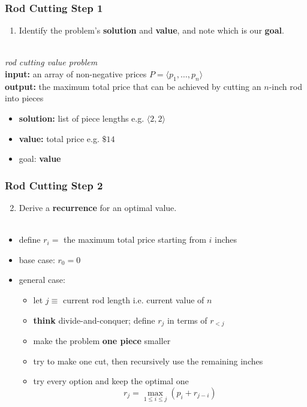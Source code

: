 \documentclass{beamer}
\newcommand{\stanza}{ \\~\ }
\begin{document}
\begin{frame} \frametitle{Rod Cutting Step 1}
\begin{enumerate}
  \item Identify the problem's \textbf{solution} and \textbf{value}, and note which is our \textbf{goal}.
  \stanza
\end{enumerate}
\emph{rod cutting value problem} \\
\textbf{input:} an array of non-negative prices $P=\langle p_1, \ldots, p_n \rangle$ \\
\textbf{output:} the maximum total price that can be achieved by cutting an $n$-inch rod into pieces
\begin{itemize}
  \item \textbf{solution:} list of piece lengths e.g. $\langle 2, 2 \rangle$
  \item \textbf{value:} total price e.g. $\$14$
  \item goal: \textbf{value}
\end{itemize}
\end{frame}

\begin{frame} \frametitle{Rod Cutting Step 2}
  \begin{enumerate}
    \setcounter{enumi}{1}
    \item Derive a \textbf{recurrence} for an optimal value.
    \stanza
  \end{enumerate}

  \begin{itemize}
    \item define $r_i = $ the maximum total price starting from $i$ inches
    \item base case: $r_0 = 0$
    \item general case:
    \begin{itemize}
      \item let $j \equiv$ current rod length i.e. current value of $n$
      \item \textbf{think} divide-and-conquer; define $r_j$ in terms of $r_{<j}$
      \item make the problem \textbf{one piece} smaller
      \item try to make one cut, then recursively use the remaining inches
      \item try every option and keep the optimal one
      \[ r_j = \max_{1 \leq i \leq j} (p_i + r_{j-i}) \]
    \end{itemize}
  \end{itemize}
\end{frame}
  
\end{document}
